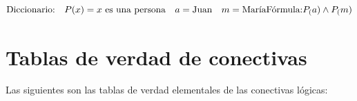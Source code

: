 \begin{example}$\\
    \text{Diccionario:}\\
    \quad P(x) = x~\text{es una persona}\\
    \quad a = \text{Juan}\\
    \quad m = \text{María}\\
    ~\\
    \text{Fórmula:}\\
    P_(a) \land P_(m)
$
\end{example}


\newpage

\section{Tablas de verdad de conectivas}

Las siguientes son las tablas de verdad elementales de las conectivas lógicas:

